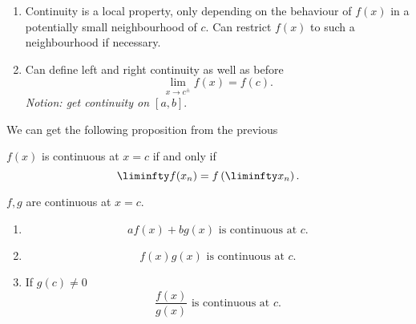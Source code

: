 \documentclass[10pt, a4paper]{article}
\begin{document}
\begin{remark}\phantom{}
    \begin{enumerate}[label = (\roman*)]
        \item Continuity is a local property,
        only depending on the behaviour of $f(x)$ in a potentially small neighbourhood of $c$.
        Can restrict $f(x)$ to such a neighbourhood if necessary.

        \item Can define left and right continuity as well as before
        \[
        \lim_{x \to c ^ {\pm}}f(x) = f(c).
        \]
        \textit{Notion:
        get continuity on $[a, b]$}.
    \end{enumerate}
\end{remark}

We can get the following proposition from the previous
\begin{proposition}
    $f(x)$ is continuous at $x = c$ if and only if
    \[
    \liminfty f(x_n) = f\left(\liminfty x_n\right).
    \]
\end{proposition}

\begin{theorem}
    $f, g$ are continuous at $x = c$.
    \begin{enumerate}[label = (\roman*)]
        \item
        \[
        af(x) + bg(x) \text{ is continuous at } c.
        \]

        \item
        \[
        f(x)g(x) \text{ is continuous at } c.
        \]

        \item If $g(c) \neq 0$
        \[
        \frac{f(x)}{g(x)} \text{ is continuous at } c.
        \]
    \end{enumerate}
\end{theorem}
\end{document}
